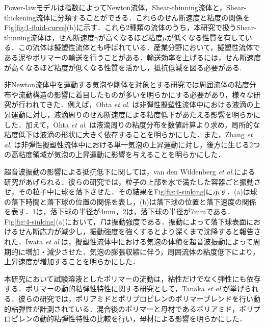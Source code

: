 Power-lawモデルは指数によってNewton流体，Shear-thinning流体と，Shear-thickening流体に分類することができる．これらのせん断速度と粘度の関係をFig\ref{fig:1-fluid-curve}(b)に示す．これら2種類の流体のうち，本研究で扱うShear-thinning流体は，せん断速度$\dot{\gamma}$が高くなるほど粘度$\mu$が低くなる性質を有している．この流体は擬塑性流体とも呼ばれている．産業分野において，擬塑性流体である泥やポリマーの輸送を行うことがある．輸送効率を上げるには，せん断速度が高くなるほど粘度が低くなる性質を活かし，抵抗低減を図る必要がある.

非Newton流体中を運動する気泡や剛体を対象とする研究では周囲流体の粘度分布や流動構造の影響に着目したものが多いを明らかにする必要があり，様々な研究が行われてきた．例えば，Ohta \textit{et al}. \cite{ref:2}は非弾性擬塑性流体中における液滴の上昇運動に対し，液滴周りのせん断速度による粘度低下があたえる影響を明らかにした．加えて，Ohta \textit{et al}. \cite{ref:3}は液滴周りの粘度分布を数値計算より求め，局所的な粘度低下は液滴の形状に大きく依存することを明らかにした．また，Zhang \textit{et al}. \cite{ref:4}は非弾性擬塑性流体中における単一気泡の上昇運動に対し，後方に生じる2つの高粘度領域が気泡の上昇運動に影響を与えることを明らかにした．

超音波振動の影響による抵抗低下に関しては，van den Wildenberg \textit{et al}.\cite{ref:6}による研究があげられる．彼らの研究では，粒子の上部を水で満たした容器ごと振動させ，その粒子中に球を落下させた．その結果をFig\ref{fig:4-sinking}に示す．(a)は球の落下時間と落下球の位置の関係を表し，(b)は落下球の位置と落下速度の関係を表す．1は，落下球の半径が4mm，2は，落下球の半径が7mmである．Fig\ref{fig:4-sinking}(a)において，$\Gamma$は振動強度である．振動によって落下球表面におけるせん断応力が減少し，振動強度を強くするとより深くまで沈降すると報告された．Iwata \textit{et al}.\cite{ref:5}は，擬塑性流体中における気泡の体積を超音波振動によって周期的に増加・減少させた．気泡の膨張収縮に伴う，周囲流体の粘度低下により，上昇速度が増加することを明らかにした．

本研究において試験溶液としたポリマーの流動は，粘性だけでなく弾性にも依存する\cite{viscoelasticity}．ポリマーの動的粘弾性特性に関する研究として，Tanaka \textit{et al}.\cite{田中勝敏1993ポリアミド}が挙げられる．彼らの研究では，ポリアミドとポリプロピレンのポリマーブレンドを行い動的粘弾性が計測されている．混合後のポリマーと母材であるポリアミド，ポリプロピレンの動的粘弾性特性の比較を行い，母材による影響を明らかにした．

